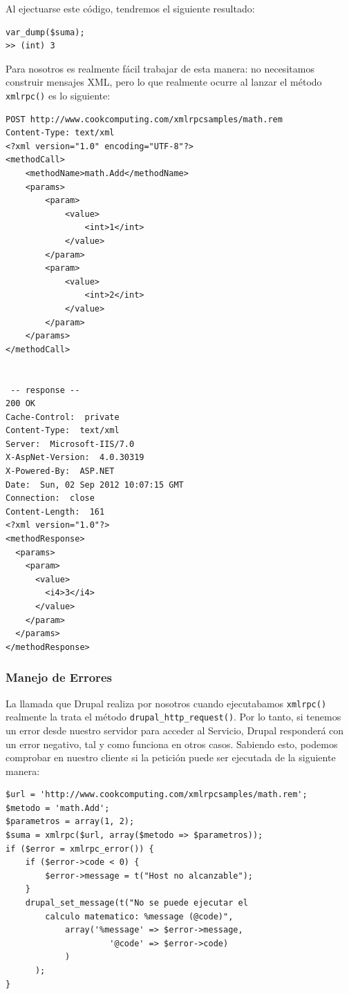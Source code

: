 Al ejectuarse este código, tendremos el siguiente resultado:

\begin{verbatim}
var_dump($suma);
>> (int) 3
\end{verbatim}

Para nosotros es realmente fácil trabajar de esta manera: no necesitamos construir mensajes XML, pero lo que 
realmente ocurre al lanzar el método \verb|xmlrpc()| es lo siguiente:

\begin{verbatim}
POST http://www.cookcomputing.com/xmlrpcsamples/math.rem
Content-Type: text/xml
<?xml version="1.0" encoding="UTF-8"?>
<methodCall>
    <methodName>math.Add</methodName>
    <params>
        <param>
            <value>
                <int>1</int>
            </value>
        </param>
        <param>
            <value>
                <int>2</int>
            </value>
        </param>
    </params>
</methodCall>
    

 -- response --
200 OK
Cache-Control:  private
Content-Type:  text/xml
Server:  Microsoft-IIS/7.0
X-AspNet-Version:  4.0.30319
X-Powered-By:  ASP.NET
Date:  Sun, 02 Sep 2012 10:07:15 GMT
Connection:  close
Content-Length:  161
<?xml version="1.0"?>
<methodResponse>
  <params>
    <param>
      <value>
        <i4>3</i4>
      </value>
    </param>
  </params>
</methodResponse>
\end{verbatim}

\subsubsection{\large{Manejo de Errores}}

La llamada que Drupal realiza por nosotros cuando ejecutabamos \verb|xmlrpc()| realmente la trata el método 
\verb|drupal_http_request()|. Por lo tanto, si tenemos un error desde nuestro servidor para acceder al Servicio, 
Drupal responderá con un error negativo, tal y como funciona en otros casos. Sabiendo esto, podemos comprobar 
en nuestro cliente si la petición puede ser ejecutada de la siguiente manera: 

\begin{verbatim}
$url = 'http://www.cookcomputing.com/xmlrpcsamples/math.rem';
$metodo = 'math.Add';
$parametros = array(1, 2);
$suma = xmlrpc($url, array($metodo => $parametros));
if ($error = xmlrpc_error()) {
    if ($error->code < 0) {
        $error->message = t("Host no alcanzable");
    }
    drupal_set_message(t("No se puede ejecutar el
    	calculo matematico: %message (@code)", 
            array('%message' => $error->message,
                     '@code' => $error->code)
            )
      );
}
\end{verbatim}

